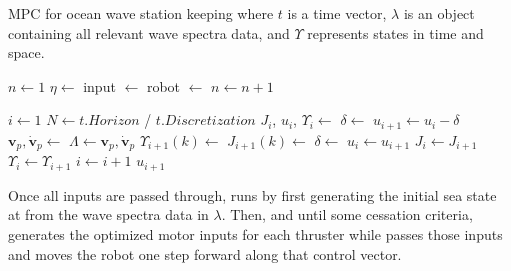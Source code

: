 \documentclass[letterpaper, 10 pt, conferences]{IEEEconf}  %
\renewcommand{\vec}[1]{\mathbf{#1}}
\begin{document}
\begin{algorithm}
\caption[caption]{MPC for ocean wave station keeping \hspace{\textwidth}where $t$ is a time vector, $\lambda$ is an object containing all relevant wave spectra data, and $\Upsilon$ represents states in time and space.}
\label{alg:MPC}
\begin{algorithmic}[1]

\State $n\gets1$
\State $\eta \gets$ 
\State input $\gets$  
\State robot $\gets$  
\State $n \gets n+1$
\EndWhile
\EndProcedure

\State $i \gets 1$
\State $N \gets t.Horizon$ / $t.Discretization$
\State $J_i$, $u_i$, $\Upsilon_i \gets$ 
\State $\delta \gets$  
\State $u_{i+1} \gets u_{i} - \delta$
\State $\vec{v}_p, \dot{\vec{v}}_p \gets$ 
\State $\Lambda \gets \vec{v}_p, \dot{\vec{v}}_p$
\State $\Upsilon_{i+1}(k) \gets$ 
\State $J_{i+1}(k) \gets$ 
\EndFor
\State $\delta \gets$ 
\State $u_i \gets u_{i+1}$
\State $J_i \gets J_{i+1}$
\State $\Upsilon_i \gets \Upsilon_{i+1}$
\State $i \gets i+1$
\EndWhile
\State \Return $u_{i+1}$
\EndFunction

\end{algorithmic}
\end{algorithm}

Once all inputs are passed through,  runs by first generating the initial sea state at  from the wave spectra data in $\lambda$. Then, and until some cessation criteria,  generates the optimized motor inputs for each thruster while  passes those inputs and moves the robot one step forward along that control vector. 
\end{document}
